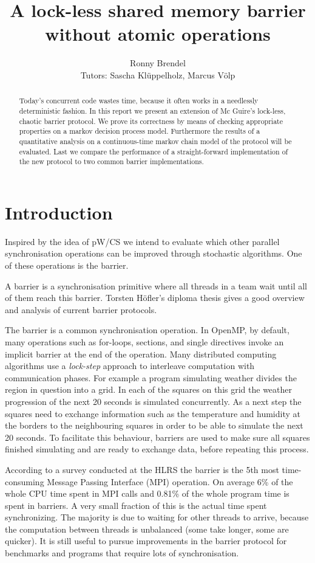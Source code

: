 \documentclass[a4paper, 10pt]{article}
\title{A lock-less shared memory barrier without atomic operations}
\author{Ronny Brendel\\Tutors: Sascha Kl\"uppelholz, Marcus V\"olp}
\begin{document}
\maketitle

\begin{abstract}
Today's concurrent code wastes time, because it often works in a needlessly deterministic fashion. In this report we present an extension of Mc Guire's lock-less, chaotic barrier protocol. We prove its correctness by means of checking appropriate properties on a markov decision process model. Furthermore the results of a quantitative analysis on a continuous-time markov chain model of the protocol will be evaluated. Last we compare the performance of a straight-forward implementation of the new protocol to two common barrier implementations.
\end{abstract}

\section{Introduction}
Inspired by the idea of pW/CS\cite{pwcs} we intend to evaluate which other parallel synchronisation operations can be improved through stochastic algorithms. One of these operations is the barrier.

A barrier is a synchronisation primitive where all threads in a team wait until all of them reach this barrier. Torsten H\"ofler's diploma thesis\cite{hoefler2005} gives a good overview and analysis of current barrier protocols.

The barrier is a common synchronisation operation. In OpenMP\cite{omp}, by default, many operations such as for-loops, sections, and single directives invoke an implicit barrier at the end of the operation. Many distributed computing algorithms use a \emph{lock-step} approach to interleave computation with communication phases. For example a program simulating weather divides the region in question into a grid. In each of the squares on this grid the weather progression of the next 20 seconds is simulated concurrently. As a next step the squares need to exchange information such as the temperature and humidity at the borders to the neighbouring squares in order to be able to simulate the next 20 seconds. To facilitate this behaviour, barriers are used to make sure all squares finished simulating and are ready to exchange data, before repeating this process.

According to a survey conducted at the HLRS\cite{rab00} the barrier is the 5th most time-consuming Message Passing Interface (MPI)\cite{mpi} operation. On average 6\% of the whole CPU time spent in MPI calls and 0.81\% of the whole program time is spent in barriers. A very small fraction of this is the actual time spent synchronizing. The majority is due to waiting for other threads to arrive, because the computation between threads is unbalanced (some take longer, some are quicker). It is still useful to pursue improvements in the barrier protocol for benchmarks and programs that require lots of synchronisation.
\end{document}
